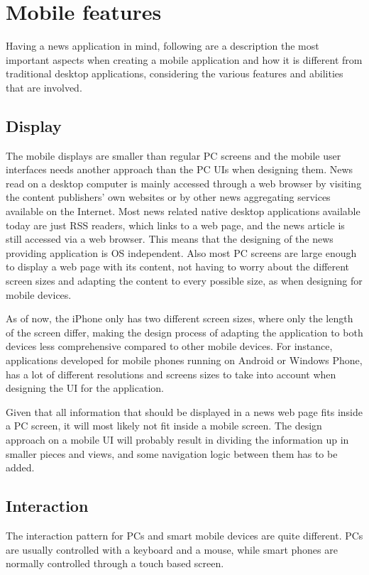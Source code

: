 \chapter{Mobile features}
\label{chapter_mobile_features}

Having a news application in mind, following are a description the most important aspects when creating a mobile application and how it is different from traditional desktop applications, considering the various features and abilities that are involved.

\section{Display}
The mobile displays are smaller than regular PC screens and the mobile user interfaces needs another approach than the PC UIs when designing them. News read on a desktop computer is mainly accessed through a web browser by visiting the content publishers' own websites or by other news aggregating services available on the Internet. Most news related native desktop applications available today are just RSS readers, which links to a web page, and the news article is still accessed via a web browser. This means that the designing of the news providing application is OS independent. Also most PC screens are large enough to display a web page with its content, not having to worry about the different screen sizes and adapting the content to every possible size, as when designing for mobile devices.

As of now, the iPhone only has two different screen sizes, where only the length of the screen differ, making the design process of adapting the application to both devices less comprehensive compared to other mobile devices. For instance, applications developed for mobile phones running on Android or Windows Phone, has a lot of different resolutions and screens sizes to take into account when designing the UI for the application.

Given that all information that should be displayed in a news web page fits inside a PC screen, it will most likely not fit inside a mobile screen. The design approach on a mobile UI will probably result in dividing the information up in smaller pieces and views, and some navigation logic between them has to be added.

\section{Interaction}
The interaction pattern for PCs and smart mobile devices are quite different. PCs are usually controlled with a keyboard and a mouse, while smart phones are normally controlled through a touch based screen.

